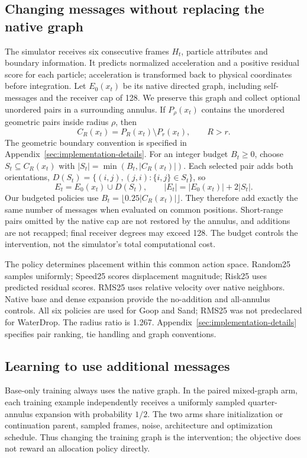 \subsection{Changing messages without replacing the native graph}
The simulator receives six consecutive frames $H_t$, particle attributes and boundary information. It predicts normalized acceleration and a positive residual score for each particle; acceleration is transformed back to physical coordinates before integration. Let $E_0(x_t)$ be its native directed graph, including self-messages and the receiver cap of 128. We preserve this graph and collect optional unordered pairs in a surrounding annulus. If $P_\rho(x_t)$ contains the unordered geometric pairs inside radius $\rho$, then
\[
 C_R(x_t)=P_R(x_t)\setminus P_r(x_t),\qquad R>r.
\]
The geometric boundary convention is specified in Appendix~\ref{sec:implementation-details}.
For an integer budget $B_t\ge0$, choose $S_t\subseteq C_R(x_t)$ with $|S_t|=\min(B_t,|C_R(x_t)|)$. Each selected pair adds both orientations, $D(S_t)=\{(i,j),(j,i):\{i,j\}\in S_t\}$, so
\begin{equation}
 E_t=E_0(x_t)\cup D(S_t),\qquad |E_t|=|E_0(x_t)|+2|S_t|.
 \label{eq:budget}
\end{equation}
Our budgeted policies use $B_t=\lfloor0.25|C_R(x_t)|\rfloor$. They therefore add exactly the same number of messages when evaluated on common positions. Short-range pairs omitted by the native cap are not restored by the annulus, and additions are not recapped; final receiver degrees may exceed 128. The budget controls the intervention, not the simulator's total computational cost.

The policy determines placement within this common action space. Random25 samples uniformly; Speed25 scores displacement magnitude; Risk25 uses predicted residual scores. RMS25 uses relative velocity over native neighbors. Native base and dense expansion provide the no-addition and all-annulus controls. All six policies are used for Goop and Sand; RMS25 was not predeclared for WaterDrop. The radius ratio is 1.267. Appendix~\ref{sec:implementation-details} specifies pair ranking, tie handling and graph conventions.

\subsection{Learning to use additional messages}
Base-only training always uses the native graph. In the paired mixed-graph arm, each training example independently receives a uniformly sampled quarter-annulus expansion with probability $1/2$. The two arms share initialization or continuation parent, sampled frames, noise, architecture and optimization schedule. Thus changing the training graph is the intervention; the objective does not reward an allocation policy directly.

